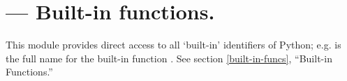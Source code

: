 \section{ ---
         Built-in functions.}



This module provides direct access to all `built-in' identifiers of
Python; e.g.  is the full name for the built-in
function .  See section \ref{built-in-funcs}, ``Built-in
Functions.''
